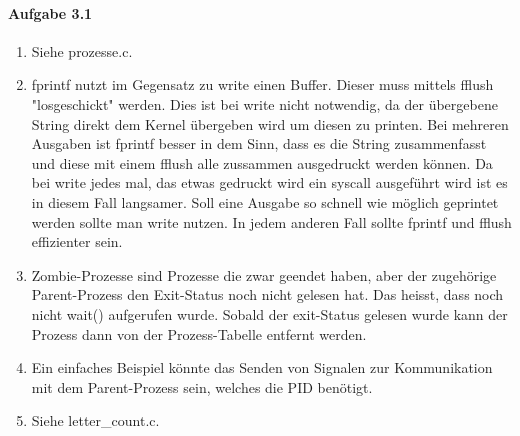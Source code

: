\documentclass[11pt]{article}
\begin{document}

\paragraph{Aufgabe 3.1}

\begin{enumerate}[label=\alph*)]
\item Siehe prozesse.c.

\item fprintf nutzt im Gegensatz zu write einen Buffer. Dieser muss mittels fflush "losgeschickt" werden. Dies ist bei write nicht notwendig, da der übergebene String direkt dem Kernel übergeben wird um diesen zu printen. Bei mehreren Ausgaben ist fprintf besser in dem Sinn, dass es die String zusammenfasst und diese mit einem fflush alle zussammen ausgedruckt werden können. Da bei write jedes mal, das etwas gedruckt wird ein syscall ausgeführt wird ist es in diesem Fall langsamer. Soll eine Ausgabe so schnell wie möglich geprintet werden sollte man write nutzen. In jedem anderen Fall sollte fprintf und fflush effizienter sein.

\item Zombie-Prozesse sind Prozesse die zwar geendet haben, aber der zugehörige Parent-Prozess den Exit-Status noch nicht gelesen hat. Das heisst, dass noch nicht wait() aufgerufen wurde. Sobald der exit-Status gelesen wurde kann der Prozess dann von der Prozess-Tabelle entfernt werden.

\item Ein einfaches Beispiel könnte das Senden von Signalen zur Kommunikation mit dem Parent-Prozess sein, welches die PID benötigt.

\item Siehe letter\_count.c.
\end{enumerate}
\end{document}
